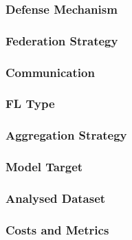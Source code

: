 \subsubsection{Defense Mechanism\label{sec:sota.quali.defense}}

\subsubsection{Federation Strategy\label{sec:sota.quali.fed}}

\subsubsection{Communication\label{sec:sota.quali.comm}}

\subsubsection{FL Type\label{sec:sota.quali.type}}

\subsubsection{Aggregation Strategy\label{sec:sota.quali.agg}}

\subsubsection{Model Target\label{sec:sota.quali.target}}

\subsubsection{Analysed Dataset\label{sec:sota.quali.dataset}}

\subsubsection{Costs and Metrics\label{sec:sota.quali.metrics}}
